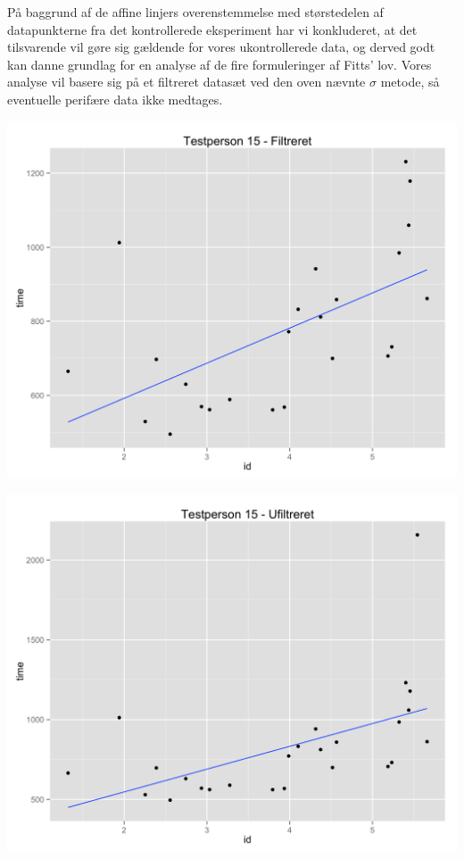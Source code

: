 \newpage
På baggrund af de affine linjers overenstemmelse med størstedelen af datapunkterne fra det kontrollerede eksperiment har vi konkluderet, at det tilsvarende vil gøre sig gældende for vores ukontrollerede data, og derved godt kan danne grundlag for en analyse af de fire formuleringer af Fitts' lov. Vores analyse vil basere sig på et filtreret datasæt ved den oven nævnte $\sigma$ metode, så eventuelle perifære data ikke medtages.

\begin{minipage}{\linewidth}
	\begin{minipage}[b]{.50\linewidth}
		\includegraphics[width=\textwidth]{images/plots/plot_model_test_comparison_filtered}
		\label{fig:testdeltager7filter}
	\end{minipage}
	\begin{minipage}[b]{0.50\linewidth}
		\includegraphics[width=\textwidth]{images/plots/plot_model_test_comparison_unfiltered}
		\label{fig:testdeltager7unfilter}
	\end{minipage}
\end{minipage}

